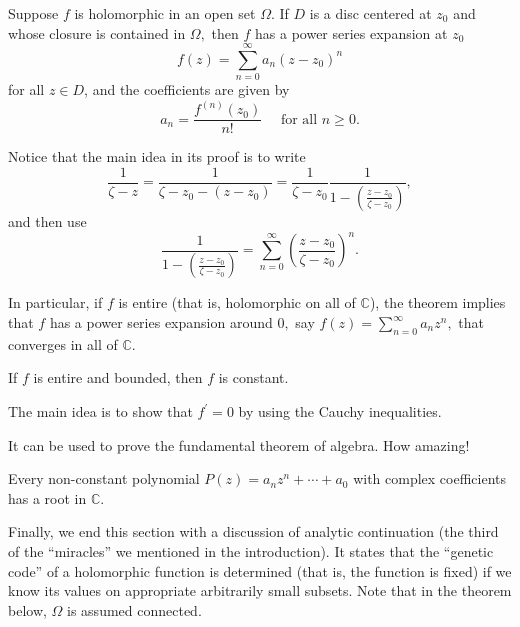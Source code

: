\documentclass{chapter}
\begin{document}
            \begin{theorem}
                Suppose $f$ is holomorphic in an open set $\Omega$. If $D$ is a disc centered at $z_{0}$ and whose closure is contained in $\Omega,$ then $f$ has a power series expansion at $z_{0}$ \[f(z)=\sum_{n=0}^{\infty} a_{n}\left(z-z_{0}\right)^{n}\] for all $z \in D$, and the coefficients are given by \[a_{n}=\frac{f^{(n)}\left(z_{0}\right)}{n !} \quad \text { for all } n \geq 0.\]
                \label{theorem: holomorphic to analytic}
            \end{theorem}
            \begin{remark}
                Notice that the main idea in its proof is to write \[\frac{1}{\zeta-z}=\frac{1}{\zeta-z_{0}-\left(z-z_{0}\right)}=\frac{1}{\zeta-z_{0}} \frac{1}{1-\left(\frac{z-z_{0}}{\zeta-z_{0}}\right)},\] and then use \[\frac{1}{1-\left(\frac{z-z_{0}}{\zeta-z_{0}}\right)}=\sum_{n=0}^{\infty}\left(\frac{z-z_{0}}{\zeta-z_{0}}\right)^{n}.\]
            \end{remark}

            In particular, if $f$ is entire (that is, holomorphic on all of $\mathbb{C}$), the theorem implies that $f$ has a power series expansion around $0,$ say $f(z)=\sum_{n=0}^{\infty} a_{n} z^{n},$ that converges in all of $\mathbb{C}$.

            \begin{corollary}
                If $f$ is entire and bounded, then $f$ is constant.
            \end{corollary}
            \begin{remark}
                The main idea is to show that $f^{\prime}=0$ by using the Cauchy inequalities.
            \end{remark}

            It can be used to prove the fundamental theorem of algebra. How amazing!
            \begin{corollary}
                Every non-constant polynomial $P(z)=a_{n} z^{n}+\cdots+a_{0}$ with complex coefficients has a root in $\mathbb{C}$.
            \end{corollary}

            \bigskip
            Finally, we end this section with a discussion of analytic continuation (the third of the “miracles” we mentioned in the introduction). It states that the “genetic code” of a holomorphic function is determined (that is, the function is fixed) if we know its values on appropriate arbitrarily small subsets. Note that in the theorem below, $\Omega$ is assumed connected.
\end{document}
